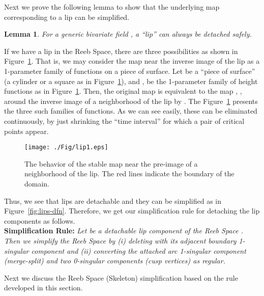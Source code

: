 \documentclass[twocolumn]{article}
\newtheorem{lemma}[theorem]{Lemma}
\renewenvironment{proof}{{\bf Proof. }}{\hspace*{\fill}\bigskip\noindent}
\begin{document}
\noindent
Next we prove the following lemma to show that the underlying map
corresponding to a lip can be simplified.
\begin{lemma}
\label{lem:detachability}
For a generic bivariate field , a  ``lip'' can always be detached safely.
\end{lemma}
\noindent
\begin{proof}
If we have a lip in the Reeb Space, there are
three possibilities as shown in Figure~\ref{fig:lips}.
That is, we may consider the map near the inverse image of
the lip as a 1-parameter family of functions on a piece of surface.
Let  be a ``piece of surface'' (a cylinder or a square as in Figure~\ref{fig:lips}),
and , 
be the 1-parameter family of height functions as in Figure~\ref{fig:lips}. 
Then, the original map  is equivalent to the map , , around the inverse image of a neighborhood of the lip by . 
The Figure~\ref{fig:lips} presents the three such families of functions.
As we can see easily, these can be eliminated continuously,
by just shrinking the ``time interval'' for which a pair
of critical points appear.
\begin{figure}[h!]
\begin{center}
\texttt{[image: ./Fig/lip1.eps]}
\caption{The behavior of the stable map
  near the pre-image of a neighborhood of the lip. The red lines indicate the boundary of the domain.}
\label{fig:lips}
\end{center}
\end{figure} 
\end{proof}


\noindent
Thus, we see that lips are detachable and they can be simplified as in
Figure~\ref{fig:lips-dfn}. Therefore, we get our simplification rule for
detaching the lip components
as follows.\\

\noindent
\textbf{Simplification Rule:}
\emph{
Let  be a detachable lip component of the Reeb
Space . Then we simplify the Reeb Space by (i) deleting  with
its adjacent boundary 1-singular component and
(ii) converting the attached arc 1-singular component (merge-split)
and two 0-singular components (cusp vertices) as regular.}

Next we discuss the Reeb Space (Skeleton) simplification based on the
rule developed in this section.
\end{document}
